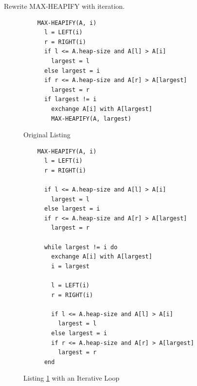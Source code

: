 \documentclass[12pt]{article}
\newenvironment{problem}[2][Problem]{\begin{trivlist}
\item[\hskip \labelsep {\bfseries #1}\hskip \labelsep {\bfseries #2.}]}{\end{trivlist}}
\begin{document}
\begin{problem}{6.2-5} Rewrite MAX-HEAPIFY with iteration. \\
\begin{figure}[h!]
  \centering
  \caption{Original Listing}
  \begin{lstlisting}
    MAX-HEAPIFY(A, i)
      l = LEFT(i)
      r = RIGHT(i)
      if l <= A.heap-size and A[l] > A[i]
        largest = l
      else largest = i
      if r <= A.heap-size and A[r] > A[largest]
        largest = r
      if largest != i
        exchange A[i] with A[largest]
        MAX-HEAPIFY(A, largest)
  \end{lstlisting}
  \label{fig:listing1}
\end{figure}

\begin{figure}[h!]
  \centering
  \caption{Listing \ref{fig:listing1} with an Iterative Loop}
  \begin{lstlisting}
    MAX-HEAPIFY(A, i)
      l = LEFT(i)
      r = RIGHT(i)

      if l <= A.heap-size and A[l] > A[i]
        largest = l
      else largest = i
      if r <= A.heap-size and A[r] > A[largest]
        largest = r

      while largest != i do
        exchange A[i] with A[largest]
        i = largest

        l = LEFT(i)
        r = RIGHT(i)

        if l <= A.heap-size and A[l] > A[i]
          largest = l
        else largest = i
        if r <= A.heap-size and A[r] > A[largest]
          largest = r
      end

  \end{lstlisting}
\end{figure}
\end{problem} \newpage
\end{document}
